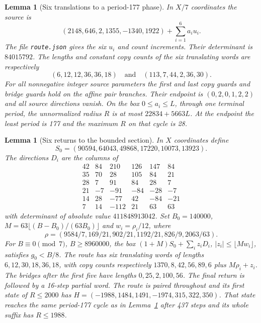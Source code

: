 \documentclass[11pt,reqno]{amsart}
\newtheorem{lemma}[theorem]{Lemma}
\theoremstyle{remark}
\newcommand{\file}[1]{\nolinkurl{#1}}
\begin{document}
\begin{lemma}[Six translations to a period-177 phase]\label{lem:comp13a}
In \(X/7\) coordinates the source is
\[
 (2148,646,2,1355,-1340,1922)+\sum_{i=1}^6 a_i u_i .
\]
The file \file{route.json} gives the six \(u_i\) and count increments.
Their determinant is \(84015792\).
The lengths and constant copy counts of the six translating
words are respectively
\[
 (6,12,12,36,36,18)\quad\text{and}\quad(113,7,44,2,36,30).
\]
For all nonnegative integer source parameters the first and last
copy guards and bridge guards hold on the affine pair branches.
Their endpoint is \((0,2,0,1,2,2)\) and all source directions
vanish. On the box \(0\le a_i\le L\), through one terminal
period, the unnormalized radius \(R\) is at most \(22834+5663L\).
At the endpoint the least period is 177 and the maximum \(R\)
on that cycle is 28.
\end{lemma}

\begin{lemma}[Six returns to the bounded section]\label{lem:comp13b}
In \(X\) coordinates define
\[
  S_0=(90594,64043,49868,17220,10073,13923).
\]
The directions \(D_i\) are the columns of
\[
\begin{array}{rrrrrr}
42 & 84 & 210 & 126 & 147 & 84\\
35 & 70 & 28 & 105 & 84 & 21\\
28 & 7 & 91 & 84 & 28 & 7\\
21 & -7 & -91 & -84 & -28 & -7\\
14 & 28 & -77 & 42 & -84 & -21\\
7 & 14 & -112 & 21 & 63 & 63
\end{array}
\]
with determinant of absolute value \(411848913042\).
Set \(B_0=140000\), \(M=63\lfloor(B-B_0)/(63B_0)\rfloor\)
and \(w_i=\rho_i/12\), where
\[
 \rho=(9584/7,169/21,902/21,1192/21,826/9,2063/63).
\]
For \(B\equiv0\pmod7\), \(B\ge8960000\), the box
\((1+M)S_0+\sum_i z_iD_i\), \(|z_i|\le\lfloor Mw_i\rfloor\),
satisfies \(g_0<B/8\). The route has six translating words of
lengths \(6,12,30,18,36,18\), with copy counts respectively
\(1370,8,42,56,89,6\) plus \(M\rho_i+z_i\).
The bridges after the first five have lengths \(0,25,2,100,56\).
The final return is followed by a 16-step partial word.
The route is paired throughout and its first state of \(R\le2000\)
has \(H=(-1988,1484,1491,-1974,315,322,350)\).
That state reaches the same period-177 cycle as in
Lemma~\ref{lem:comp13a} after 437 steps and its whole suffix
has \(R\le1988\).
\end{lemma}
\end{document}
